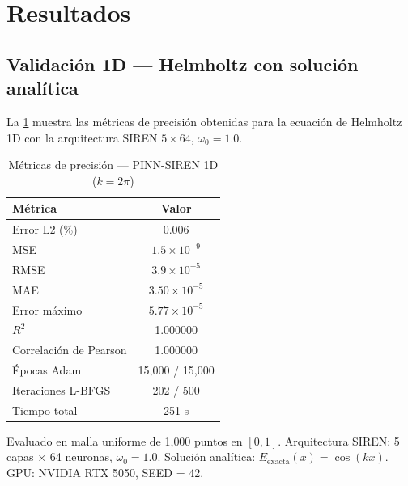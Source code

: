 
\section{Resultados}
\label{sec:resultados}

\subsection{Validación 1D --- Helmholtz con solución analítica}
\label{subsec:resultados1d}

La \cref{tab:resultados1d} muestra las métricas de precisión obtenidas para la
ecuación de Helmholtz 1D con la arquitectura SIREN $5\times64$, $\omega_0 = 1.0$.

\begin{table}[htbp]
\centering
\begin{threeparttable}
\caption{Métricas de precisión --- PINN-SIREN 1D ($k = 2\pi$)}
\label{tab:resultados1d}
\begin{tabular}{lc}
\toprule
Métrica & Valor \\
\midrule
Error L2 (\%)          & 0.006 \\
MSE                    & $1.5 \times 10^{-9}$ \\
RMSE                   & $3.9 \times 10^{-5}$ \\
MAE                    & $3.50 \times 10^{-5}$ \\
Error máximo           & $5.77 \times 10^{-5}$ \\
$R^2$                  & 1.000000 \\
Correlación de Pearson & 1.000000 \\
\midrule
Épocas Adam            & 15{,}000 / 15{,}000 \\
Iteraciones L-BFGS     & 202 / 500 \\
Tiempo total           & 251 s \\
\bottomrule
\end{tabular}
\begin{tablenotes}
\small
\item Evaluado en malla uniforme de 1{,}000 puntos en $[0,1]$.
      Arquitectura SIREN: 5 capas $\times$ 64 neuronas, $\omega_0 = 1.0$.
      Solución analítica: $E_{\mathrm{exacta}}(x) = \cos(kx)$.
      GPU: NVIDIA RTX 5050, SEED = 42.
\end{tablenotes}
\end{threeparttable}
\end{table}

